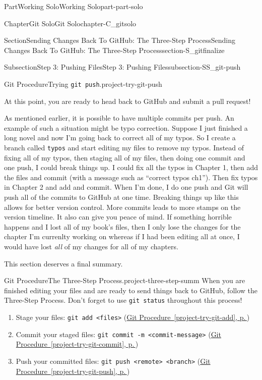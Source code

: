 \documentclass[twoside,10pt,]{book}
\newcommand{\xreffont}{\relax}
\newcommand{\mono}[1]{\texttt{#1}}
\begin{document}
\begin{partptx}{Part}{Working Solo}{}{Working Solo}{}{}{part-part-solo}
\begin{chapterptx}{Chapter}{Git Solo}{}{Git Solo}{}{}{chapter-C_gitsolo}
\begin{sectionptx}{Section}{Sending Changes Back To GitHub: The Three-Step Process}{}{Sending Changes Back To GitHub: The Three-Step Process}{}{}{section-S_gitfinalize}
\begin{subsectionptx}{Subsection}{Step 3: Pushing Files}{}{Step 3: Pushing Files}{}{}{subsection-SS_git-push}
\begin{project}{Git Procedure}{Trying \mono{git push}.}{project-try-git-push}
\begin{enumerate}[font=\bfseries,label=(\alph*),ref=\alph*]
\begin{enumerate}[font=\bfseries,label=(\roman*),ref=\theenumi.\roman*]
\end{enumerate}%
\end{enumerate}%
At this point, you are ready to head back to GitHub and submit a pull request!%
\end{project}%
As mentioned earlier, it is possible to have multiple commits per push. An example of such a situation might be typo correction. Suppose I just finished a long novel and now I'm going back to correct all of my typos. So I create a branch called \mono{typos} and start editing my files to remove my typos. Instead of fixing all of my typos, then staging all of my files, then doing one commit and one push, I could break things up. I could fix all the typos in Chapter 1, then add the files and commit (with a message such as ``correct typos ch1''). Then fix typos in Chapter 2 and add and commit. When I'm done, I do one push and Git will push all of the commits to GitHub at one time. Breaking things up like this allows for better version control. More commits leads to more stamps on the version timeline. It also can give you peace of mind. If something horrible happens and I lost all of my book's files, then I only lose the changes for the chapter I'm currenlty working on whereas if I had been editing all at once, I would have lost \emph{all} of my changes for all of my chapters.%
\par
This section deserves a final summary.%
\begin{project}{Git Procedure}{The Three-Step Process.}{project-three-step-summ}%
%
%
When you are finished editing your files and are ready to send things back to GitHub, follow the Three-Step Process. Don't forget to use \mono{git status} throughout this process!%
\begin{enumerate}
\item{}Stage your files: \mono{git add <files>} (\hyperref[project-try-git-add]{Git Procedure~{\xreffont\ref{project-try-git-add}}, p.\,\pageref{project-try-git-add}})%
\item{}Commit your staged files: \mono{git commit -m \textquotedbl{}<commit-message>\textquotedbl{}} (\hyperref[project-try-git-commit]{Git Procedure~{\xreffont\ref{project-try-git-commit}}, p.\,\pageref{project-try-git-commit}})%
\item{}Push your committed files: \mono{git push <remote> <branch>} (\hyperref[project-try-git-push]{Git Procedure~{\xreffont\ref{project-try-git-push}}, p.\,\pageref{project-try-git-push}})%
\end{enumerate}

\end{project}
\end{subsectionptx}
\end{sectionptx}
\end{chapterptx}
\end{partptx}
\end{document}
